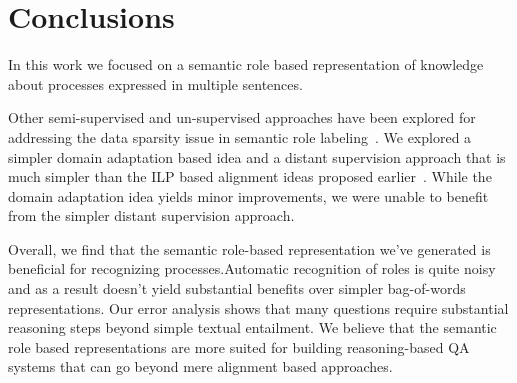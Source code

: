 \section{Conclusions}
In this work we focused on a semantic role based representation of knowledge about processes expressed in multiple sentences.

Other semi-supervised and un-supervised approaches have been explored for addressing the data sparsity issue in semantic role labeling~\cite{furstenau-emnlp2009,lang-emnlp2011,lang-naacl2010}. We explored a simpler domain adaptation based idea and a distant supervision approach that is much simpler than the ILP based alignment ideas proposed earlier~\cite{furstenau-emnlp2009}. While the domain adaptation idea yields minor improvements, we were unable to benefit from the simpler distant supervision approach.

Overall, we find that the semantic role-based representation we've generated is beneficial for recognizing processes.Automatic recognition of roles is quite noisy and as a result doesn't yield substantial benefits over simpler bag-of-words representations. Our error analysis shows that many questions require substantial reasoning steps beyond simple textual entailment. We believe that the semantic role based representations are more suited for building reasoning-based QA systems that can go beyond mere alignment based approaches.
